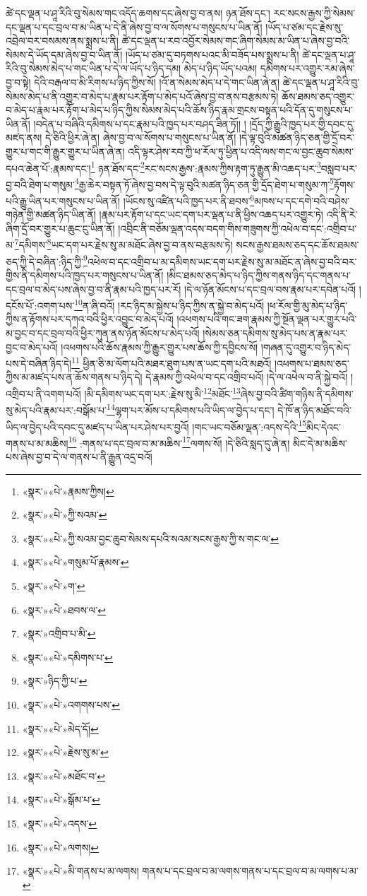 ཚེ་དང་ལྡན་པ་ཤཱ་རིའི་བུ་སེམས་གང་འདོད་ཆགས་དང་ཞེས་བྱ་བ་ནས། ཉན་ཐོས་དང་། རང་སངས་རྒྱས་ཀྱི་སེམས་དང་ལྡན་པ་དང་བྲལ་བ་མ་ཡིན་པ་དེ་ནི་ཞེས་བྱ་བ་ལ་སོགས་པ་གསུངས་པ་ཡིན་ནོ། །ཡོད་པ་ཙམ་དང་རྗེས་སུ་འབྲེལ་བར་བསམས་ནས་སྨྲས་པ་ནི། ཚེ་དང་ལྡན་པ་རབ་འབྱོར་སེམས་གང་ཞིག་སེམས་མ་ཡིན་པ་ཞེས་བྱ་བའི་སེམས་དེ་ཡོད་དམ་ཞེས་བྱ་བ་ཡིན་ནོ། །ཡོད་པ་ཙམ་དུ་བཏགས་པའང་མི་བཟོད་པས་སྨྲས་པ་ནི། ཚེ་དང་ལྡན་པ་ཤཱ་རིའི་བུ་སེམས་མེད་པ་གང་ཡིན་པ་དེ་ལ་ཡོད་པ་ཉིད་དམ། མེད་པ་ཉིད་ཡོད་པའམ། དམིགས་པར་འགྱུར་རམ་ཞེས་བྱ་བ་སྟེ། དེའི་བརྒལ་བ་མི་རིགས་པ་ཉིད་ཀྱིས་སོ། །འོ་ན་སེམས་མེད་པ་དེ་གང་ཡིན་ཞེ་ན། ཚེ་དང་ལྡན་པ་ཤཱ་རིའི་བུ་སེམས་མེད་པ་ནི་འགྱུར་བ་མེད་པ་རྣམ་པར་རྟོག་པ་མེད་པའོ་ཞེས་བྱ་བ་ནས་བརྩམས་ཏེ། ཆོས་ཐམས་ཅད་འགྱུར་བ་མེད་པ་རྣམ་པར་རྟོག་པ་མེད་པ་ཉིད་ཀྱིས་སེམས་མེད་པའི་ཆོས་ཉིད་རྣམ་གྲངས་བསྟན་པའི་དོན་དུ་གསུངས་པ་ཡིན་ནོ། །བདེན་པ་བཞིའི་དམིགས་པ་དང་རྣམ་པའི་ཁྱད་པར་བཤད་ཟིན་ཏོ།། །
།དྲོད་ཀྱི་རྒྱུའི་ཁྱད་པར་གྱི་དབང་དུ་མཛད་ནས། དེ་ཅིའི་ཕྱིར་ཞེ་ན། ཞེས་བྱ་བ་ལ་སོགས་པ་གསུངས་པ་ཡིན་ནོ། །དེ་ལྟ་བུའི་མཚན་ཉིད་ཅན་གྱི་དྲོ་བར་གྱུར་པ་གང་གི་རྒྱུར་གྱུར་པ་ཡིན་ཞེ་ན། འདི་ལྟར་ཤེས་རབ་ཀྱི་ཕ་རོལ་ཏུ་ཕྱིན་པ་འདི་ལས་གང་ལ་བྱང་ཆུབ་སེམས་དཔའ་ཆེན་པོ་:རྣམས་དང་།\footnote{«སྣར་»«པེ་»རྣམས་ཀྱིས།} ཉན་ཐོས་དང་\footnote{«སྣར་»«པེ་»ཀྱི་སའམ་}རང་སངས་རྒྱས་:རྣམས་ཀྱིས་རྟག་ཏུ་རྒྱུན་མི་འཆད་པར་\footnote{«སྣར་»«པེ་»ཀྱི་སའམ་བྱང་ཆུབ་སེམས་དཔའི་སའམ་སངས་རྒྱས་ཀྱི་ས་གང་ལ་}བསླབ་པར་བྱ་བའི་ཐེག་པ་གསུམ་\footnote{«སྣར་»«པེ་»གསུམ་པོ་རྣམས་}རྒྱ་ཆེར་བསྟན་ཏོ་ཞེས་བྱ་བས་དེ་ལྟ་བུའི་མཚན་ཉིད་ཅན་གྱི་དྲོད་ཐེག་པ་གསུམ་ཀ་\footnote{«སྣར་»«པེ་»ག་}རྟོགས་པའི་རྒྱུ་ཡིན་པར་གསུངས་པ་ཡིན་ནོ། །ཡོངས་སུ་འཛིན་པའི་ཁྱད་པར་ནི་ཐབས་\footnote{«སྣར་»«པེ་»ཐབས་ལ་}མཁས་པ་དང་དགེ་བའི་བཤེས་གཉེན་གྱི་མཚན་ཉིད་ཡིན་ནོ། །རྣམ་པར་རྟོག་པ་དང་ཡང་དག་པར་ལྡན་པ་ནི་ཕྱིས་འཆད་པར་འགྱུར་ཏེ། འདི་ནི་རེ་ཞིག་དྲོ་བར་གྱུར་པ་ཆུང་ངུ་ཡིན་ནོ། །འབྲིང་ནི་བཅོམ་ལྡན་འདས་བདག་གིས་གཟུགས་ཀྱི་འཕེལ་བ་དང་:འགྲིབ་པ་མ་\footnote{«སྣར་»འགྲིབ་པ་མི་}དམིགས་\footnote{«སྣར་»«པེ་»དམིགས་པ་}ཡང་དག་པར་རྗེས་སུ་མ་མཐོང་ཞེས་བྱ་བ་ནས་བརྩམས་ཏེ། སངས་རྒྱས་ཐམས་ཅད་དང་ཆོས་ཐམས་ཅད་ཀྱི་དེ་བཞིན་:ཉིད་ཀྱི་\footnote{«སྣར་»ཉིད་ཀྱི་པ་}འཕེལ་བ་དང་འགྲིབ་པ་མ་དམིགས་ཡང་དག་པར་རྗེས་སུ་མ་མཐོང་ན་ཞེས་བྱ་བའི་བར་གྱིས་ནི་དམིགས་པའི་ཁྱད་པར་གསུངས་པ་ཡིན་ནོ། །མིང་ཐམས་ཅད་མེད་པ་ཉིད་ཀྱིས་གནས་ཉིད་དང་གནས་པ་དང་བྲལ་བ་མེད་པས་ཞེས་བྱ་བ་ནི་རྣམ་པའི་ཁྱད་པར་རོ། །དེ་ལ་ཉོན་མོངས་པ་དང་བྲལ་བས་རྣམ་པར་དབེན་པའོ། །དངོས་པོ་:འགག་པས་\footnote{«སྣར་»«པེ་»འགགས་པས་}ན་ཞི་བའོ། །རང་ཉིད་མ་སྐྱེས་པ་ཉིད་ཀྱིས་ན་སྐྱེ་བ་མེད་པའོ། །ཕ་རོལ་གྱི་མུ་མེད་པ་ཉིད་ཀྱིས་ན་རྟོགས་པར་དཀའ་བའི་ཕྱིར་འབྱུང་བ་མེད་པའོ། །འཕགས་པའི་གང་ཟག་རྣམས་ཀྱི་སྔོན་ལྡན་པར་གྱུར་པའི་མ་བྱང་བ་དང་བྲལ་བའི་ཕྱིར་ཀུན་ནས་ཉོན་མོངས་པ་མེད་པའོ། །སེམས་ཅན་དམིགས་སུ་མེད་པས་ན་རྣམ་པར་བྱང་བ་མེད་པའོ། །འཕགས་པའི་ཆོས་རྣམས་ཀྱི་རྒྱུར་གྱུར་པས་ཆོས་ཀྱི་དབྱིངས་སོ། །གཞན་དུ་འགྱུར་བ་ཉིད་མེད་པས་དེ་བཞིན་ཉིད་དེ།\footnote{«སྣར་»«པེ་»མེད་དོ།} ཕྱིན་ཅི་མ་ལོག་པའི་མཐར་ཐུག་པས་ན་ཡང་དག་པའི་མཐའོ། །འཕགས་པ་ཐམས་ཅད་ཀྱིས་མ་མཛད་པས་ན་ཆོས་གནས་པ་ཉིད་དེ། དེ་རྣམས་ཀྱི་འཕེལ་བ་དང་འགྲིབ་པའོ། །དེ་ལ་འཕེལ་བ་ནི་སྐྱེ་བའོ། །འགྲིབ་པ་ནི་འགག་པའོ། །མི་དམིགས་ཡང་དག་པར་:རྗེས་སུ་མི་\footnote{«སྣར་»«པེ་»རྗེས་སུ་མ་}མཐོང་\footnote{«སྣར་»«པེ་»མཐོང་བ་}ཞེས་བྱ་བའི་ཚིག་གཉིས་ནི་དམིགས་སུ་མེད་པའི་རྣམ་པར་:བསྒོམ་པ་\footnote{«སྣར་»«པེ་»སྒོམ་པ་}ལྷག་པར་མོས་པ་དམིགས་པའི་ཡིད་ལ་བྱེད་པ་དང་། དེ་ཁོ་ན་ཉིད་མཐོང་བའི་ཡིད་ལ་བྱེད་པའི་དབང་དུ་མཛད་པ་ཡིན་པར་ཤེས་པར་བྱའོ། །གང་ཡང་བཅོམ་ལྡན་:འདས་དེའི་\footnote{«སྣར་»«པེ་»འདས་}མིང་དེའང་གནས་པ་མ་མཆིས།\footnote{«སྣར་»«པེ་»ལགས།} :གནས་པ་དང་བྲལ་བ་མ་མཆིས་\footnote{«སྣར་»«པེ་»མི་གནས་པ་མ་ལགས། གནས་པ་དང་བྲལ་བ་མ་ལགས་གནས་པ་དང་བྲལ་བ་མ་ལགས་པ་མ་}ལགས་སོ། །དེ་ཅིའི་སླད་དུ་ཞེ་ན། མིང་དེ་མ་མཆིས་པས་ཞེས་བྱ་བ་དེ་ལ་གནས་པ་ནི་རྒྱུན་འདྲ་བའོ། 